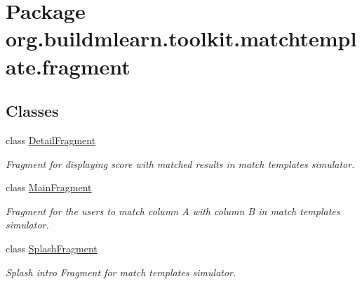 \hypertarget{namespaceorg_1_1buildmlearn_1_1toolkit_1_1matchtemplate_1_1fragment}{}\section{Package org.\+buildmlearn.\+toolkit.\+matchtemplate.\+fragment}
\label{namespaceorg_1_1buildmlearn_1_1toolkit_1_1matchtemplate_1_1fragment}
\subsection*{Classes}
\begin{DoxyCompactItemize}
\item 
class \hyperlink{classorg_1_1buildmlearn_1_1toolkit_1_1matchtemplate_1_1fragment_1_1DetailFragment}{Detail\+Fragment}
\begin{DoxyCompactList}\small\item\em Fragment for displaying score with matched results in match template\textquotesingle{}s simulator. \end{DoxyCompactList}\item 
class \hyperlink{classorg_1_1buildmlearn_1_1toolkit_1_1matchtemplate_1_1fragment_1_1MainFragment}{Main\+Fragment}
\begin{DoxyCompactList}\small\item\em Fragment for the users to match column A with column B in match template\textquotesingle{}s simulator. \end{DoxyCompactList}\item 
class \hyperlink{classorg_1_1buildmlearn_1_1toolkit_1_1matchtemplate_1_1fragment_1_1SplashFragment}{Splash\+Fragment}
\begin{DoxyCompactList}\small\item\em Splash intro Fragment for match template\textquotesingle{}s simulator. \end{DoxyCompactList}\end{DoxyCompactItemize}

